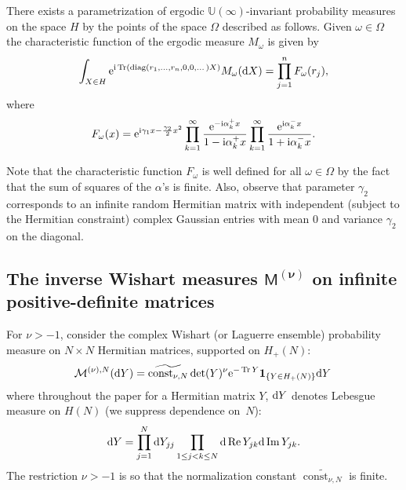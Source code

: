 \begin{Theorem} There exists a parametrization of ergodic $\mathbb{U}(\infty)$-invariant probability measures on the space $H$ by the points of the space $\Omega$ described as follows. Given $\omega \in \Omega$ the characteristic function of the ergodic measure $M_{\omega}$ is given by
\begin{gather*}
\int_{X \in H}^{}{\rm e}^{{\rm i}\operatorname{Tr}(\operatorname{diag}(r_1,\dots,r_n,0,0,\dots)X)}M_{\omega}({\rm d}X)=\prod_{j=1}^{n}F_{\omega}(r_j),
\end{gather*}
where
\begin{gather*}
F_{\omega}(x)={\rm e}^{{\rm i}\gamma_1x-\frac{\gamma_2}{2}x^ 2}\prod_{k=1}^{\infty}\frac{{\rm e}^{-{\rm i}\alpha_k^+x}}{1-{\rm i}\alpha_k^+x}\prod_{k=1}^{\infty}\frac{{\rm e}^{{\rm i}\alpha_k^-x}}{1+{\rm i}\alpha_k^-x} .
\end{gather*}
\end{Theorem}
Note that the characteristic function $F_{\omega}$ is well defined for all $\omega \in \Omega$ by the fact that the sum of squares of the $\alpha$'s is finite. Also, observe that parameter $\gamma_2$ corresponds to an infinite random Hermitian matrix with independent (subject to the Hermitian constraint) complex Gaussian entries with mean 0 and variance $\gamma_2$ on the diagonal.

\subsection[The inverse Wishart measures $\mathsf{M}^{(\nu)}$ on infinite positive-definite matrices]{The inverse Wishart measures $\boldsymbol{\mathsf{M}^{(\nu)}}$ on infinite positive-definite matrices}\label{section1.3}

For $\nu>-1$, consider the complex Wishart (or Laguerre ensemble) probability measure on $N \times N$ Hermitian matrices, supported on $H_+(N)$:
\begin{gather*}
\mathcal{M}^{(\nu),N}({\rm d}Y)=\widetilde{\operatorname{const}_{\nu, N}}\det(Y)^{\nu} {\rm e}^{-\operatorname{Tr}Y}\mathbf{1}_{\{Y \in H_+(N)\}}{\rm d}Y\,
\end{gather*}
where throughout the paper for a Hermitian matrix $Y$, ${\rm d}Y$ denotes Lebesgue measure on $H(N)$ (we suppress dependence on~$N$):
\begin{gather*}
{\rm d}Y=\prod_{j=1}^{N}{\rm d}Y_{jj} \prod_{1 \le j <k \le N}^{}{\rm d} \operatorname{Re} Y_{jk}{\rm d} \operatorname{Im} Y_{jk}.
\end{gather*}
The restriction $\nu>-1$ is so that the normalization constant $\widetilde{\operatorname{const}_{\nu, N}}$ is finite.

